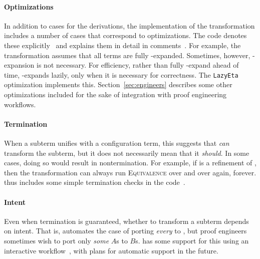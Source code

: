 \paragraph{Optimizations}
In addition to cases for the derivations, the implementation of the transformation includes a number of cases
that correspond to optimizations.
The code denotes these explicitly~\href{https://github.com/uwplse/pumpkin-pi/blob/v2.0.0/plugin/src/automation/lift/lift.ml}{}
and explains them in detail in comments~\href{https://github.com/uwplse/pumpkin-pi/blob/v2.0.0/plugin/src/automation/lift/liftrules.ml}{}.
For example, the transformation assumes that all terms are fully \smallmath{$\eta$}-expanded. Sometimes,
however, \smallmath{$\eta$}-expansion is not necessary.
For efficiency, rather than fully \smallmath{$\eta$}-expand ahead of time, \toolnamec \smallmath{$\eta$}-expands lazily, 
only when it is necessary for correctness.
The \lstinline{LazyEta} optimization implements this.
Section~\ref{sec:engineers} describes some other optimizations included for the sake of integration with proof engineering workflows.

\paragraph{Termination}
When a subterm unifies with a configuration term, this suggests that \toolnamec \textit{can}
transform the subterm, but it does not necessarily mean that it \textit{should}.
In some cases, doing so would result in nontermination.
For example, if \B is a refinement of \Aa, then the transformation can always run \textsc{Equivalence}
over and over again, forever.
\toolnamec thus includes some simple termination checks in the code~\href{https://github.com/uwplse/pumpkin-pi/blob/v2.0.0/plugin/src/automation/lift/liftrules.ml}{}. %

\paragraph{Intent}
Even when termination is guaranteed, whether to transform a subterm depends on intent.
That is, \toolnamec automates the case of porting \textit{every} \Aa to \B,
but proof engineers sometimes wish to port only \textit{some} $A$s to $B$s.
\toolnamec has some support for this using an interactive workflow~\href{https://github.com/uwplse/pumpkin-pi/blob/v2.0.0/plugin/coq/minimal_records.v}{},
with plans for automatic support in the future. %

